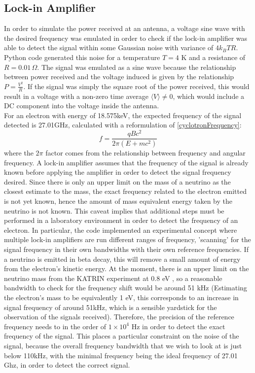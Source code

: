 \documentclass[a4paper,12pt, notitlepage]{article}
\begin{document}
\subsection{Lock-in Amplifier}
In order to simulate the power received at an antenna, a voltage sine wave with the desired frequency was emulated in order to check if the lock-in amplifier was able to detect the signal within some Gaussian noise with variance of $4k_{B}TR$. Python code generated this noise for a temperature $T = 4$ K and a resistance of $R = 0.01\,\Omega$. The signal was emulated as a sine wave because the relationship between power received and the voltage induced is given by the relationship $P = \frac{V^{2}}{R}$. If the signal was simply the square root of the power received, this would result in a voltage with a non-zero time average $\langle V \rangle \neq 0$, which would include a DC component into the voltage inside the antenna. \\
For an electron with energy of 18.575keV, the expected frequency of the signal detected is 27.01GHz, calculated with a reformulation of \cref{cyclotronFrequency}:
\begin{equation}
    f = \dfrac{qBc^{2}}{2\pi(E + mc^{2})}
\end{equation}
where the $2\pi$ factor comes from the relationship between frequency and angular frequency. 
A lock-in amplifier assumes that the frequency of the signal is already known before applying the amplifier in order to detect the signal frequency desired. Since there is only an upper limit on the mass of a neutrino as the closest estimate to the mass, the exact frequency related to the electron emitted is not yet known, hence the amount of mass equivalent energy taken by the neutrino is not known. This caveat implies that additional steps must be performed in a laboratory environment in order to detect the frequency of an electron. In particular, the code implemented an experimental concept where multiple lock-in amplifiers are run different ranges of frequency, 'scanning' for the signal frequency in their own bandwidths with their own reference frequencies.
If a neutrino is emitted in beta decay, this will remove a small amount of energy from the electron's kinetic energy.  At the moment, there is an upper limit on the neutrino mass from the KATRIN experiment at 0.8 eV \cite{Aker2021}, so a reasonable bandwidth to check for the frequency shift would be around 51 kHz (Estimating the electron's mass to be equivalently 1 eV, this corresponds to an increase in signal frequency of around 51kHz, which is a sensible yardstick for the observation of the signals received). Therefore, the precision of the reference frequency needs to in the order of $1\times10^{4}$ Hz in order to detect the exact frequency of the signal. This places a particular constraint on the noise of the signal, because the overall frequency bandwidth that we wish to look at is just below 110kHz, with the minimal frequency being the ideal frequency of 27.01 Ghz, in order to detect the correct signal. \\
\end{document}
